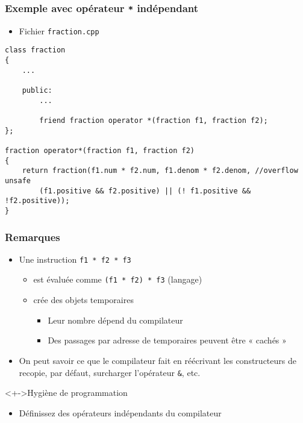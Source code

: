 \begin{frame}[containsverbatim]
\frametitle{Exemple avec opérateur \texttt{*} indépendant}
\begin{itemize}
\item Fichier \texttt{fraction.cpp}
\end{itemize}
\begin{lstlisting}
class fraction
{
	...

	public:
		...
		
		friend fraction operator *(fraction f1, fraction f2);		
};

fraction operator*(fraction f1, fraction f2)
{
	return fraction(f1.num * f2.num, f1.denom * f2.denom, //overflow unsafe 
		(f1.positive && f2.positive) || (! f1.positive && !f2.positive));
}
\end{lstlisting}
\end{frame}

\begin{frame}
\frametitle{Remarques}
\begin{itemize}[<+->]
\item Une instruction \texttt{f1 * f2 * f3}
	\begin{itemize}
	\item est évaluée comme \texttt{(f1 * f2) * f3} (langage)
	\item crée des objets temporaires
		\begin{itemize}
		\item Leur nombre dépend du compilateur
		\item Des passages par adresse de temporaires peuvent être « cachés »
		\end{itemize}	
	\end{itemize}
\item On peut savoir ce que le compilateur fait en réécrivant les constructeurs de recopie, par défaut, surcharger l'opérateur \texttt{\&}, etc.
\end{itemize}
\begin{block}<+->{Hygiène de programmation}
	\begin{itemize}[<+->]
	\item Définissez des opérateurs indépendants du compilateur
	\end{itemize}
\end{block}
\end{frame}

